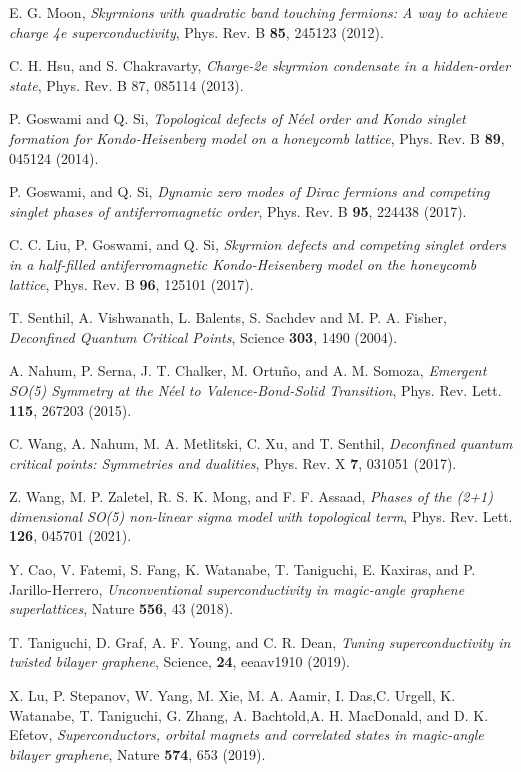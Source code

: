 \documentclass[aps,prb,amsmath,amssymb,floatfix,twocolumn]{revtex4}
\begin{document}
\begin{thebibliography}{}
 E. G. Moon, \emph{Skyrmions with quadratic band touching fermions: A way to achieve charge 4e superconductivity}, Phys. Rev. B \textbf{85}, 245123 (2012).

 C. H. Hsu, and S. Chakravarty, \emph{Charge-2e skyrmion condensate in a hidden-order state}, Phys. Rev. B 87, 085114 (2013).

 P. Goswami and Q. Si, \emph{Topological defects of N\'eel order and Kondo singlet formation for Kondo-Heisenberg model on a honeycomb lattice}, Phys. Rev. B \textbf{89}, 045124 (2014).

 P. Goswami, and Q. Si, \emph{Dynamic zero modes of Dirac fermions and competing singlet phases of antiferromagnetic order}, Phys. Rev. B \textbf{95}, 224438 (2017).

 C. C. Liu, P. Goswami, and Q. Si, \emph{Skyrmion defects and competing singlet orders in a half-filled antiferromagnetic Kondo-Heisenberg model on the honeycomb lattice}, Phys. Rev. B \textbf{96}, 125101 (2017).

 T. Senthil, A. Vishwanath, L. Balents, S. Sachdev and M. P. A. Fisher, \emph{Deconfined Quantum Critical Points}, Science \textbf{303}, 1490 (2004).

 A. Nahum, P. Serna, J. T. Chalker, M. Ortuño, and A. M. Somoza, \emph{Emergent SO(5) Symmetry at the N\'eel to Valence-Bond-Solid Transition}, Phys. Rev. Lett. \textbf{115}, 267203 (2015). 

 C. Wang, A. Nahum, M. A. Metlitski, C. Xu, and T. Senthil, \emph{Deconfined quantum critical points: Symmetries and dualities}, Phys. Rev. X \textbf{7}, 031051 (2017).

 Z. Wang, M. P. Zaletel, R. S. K. Mong, and F. F. Assaad, \emph{Phases of the (2+1) dimensional SO(5) non-linear sigma model with topological term}, Phys. Rev. Lett. \textbf{126}, 045701 (2021).

 Y. Cao, V. Fatemi, S. Fang, K. Watanabe, T. Taniguchi, E. Kaxiras, and P. Jarillo-Herrero, \emph{Unconventional superconductivity in magic-angle graphene superlattices}, Nature \textbf{556}, 43 (2018).

 T. Taniguchi, D. Graf, A. F. Young, and C. R. Dean, \emph{Tuning superconductivity in twisted bilayer graphene}, Science, \textbf{24}, eeaav1910 (2019).

  X. Lu, P. Stepanov, W. Yang, M. Xie, M. A. Aamir, I. Das,C. Urgell, K. Watanabe, T. Taniguchi, G. Zhang, A. Bachtold,A. H. MacDonald, and D. K. Efetov, \emph{Superconductors, orbital magnets and correlated states in magic-angle bilayer graphene}, Nature \textbf{574}, 653 (2019).


\end{thebibliography}
\end{document}
